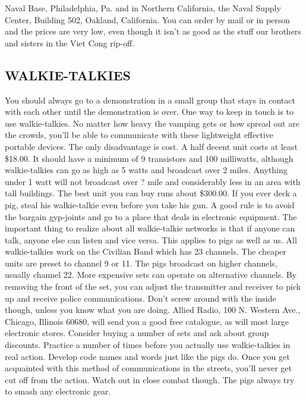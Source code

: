 \documentclass[11pt,twoside,a4paper]{book}
\begin{document}
Naval Base, Philadelphia, Pa. and in Northern California, the Naval Supply Center, Building 502, Oakland, California. You can order by mail or in person and the prices are very low, even though it isn't as good as the stuff our brothers and sisters in the Viet Cong rip-off. 

\subsection{WALKIE-TALKIES}

You should always go to a demonstration in a small group that stays in contact with each other until the demonstration is over. One way to keep in touch is to use walkie-talkies. No matter how heavy the vamping gets or how spread out are the crowds, you'll be able to communicate with these lightweight effective portable devices. The only disadvantage is cost. A half decent unit costs at least \$18.00. It should have a minimum of 9 transistors and 100 milliwatts, although walkie-talkies can go as high as 5 watts and broadcast over 2 miles. Anything under 1 watt will not broadcast over ? mile and considerably less in an area with tall buildings. The best unit you can buy runs about \$300.00. If you ever deck a pig, steal his walkie-talkie even before you take his gun. A good rule is to avoid the bargain gyp-joints and go to a place that deals in electronic equipment. The important thing to realize about all walkie-talkie networks is that if anyone can talk, anyone else can listen and vice versa. This applies to pigs as well as us. All walkie-talkies work on the Civilian Band which has 23 channels. The cheaper units are preset to channel 9 or 11. The pigs broadcast on higher channels, usually channel 22. More expensive sets can operate on alternative channels. By removing the front of the set, you can adjust the transmitter and receiver to pick up and receive police communications. Don't screw around with the inside though, unless you know what you are doing. Allied Radio, 100 N. Western Ave., Chicago, Illinois 60680, will send you a good free catalogue, as will most large electronic stores. Consider buying a number of sets and ask about group discounts. Practice a number of times before you actually use walkie-talkies in real action. Develop code names and words just like the pigs do. Once you get acquainted with this method of communications in the streets, you'll never get cut off from the action. Watch out in close combat though. The pigs always try to smash any electronic gear. 
\end{document}
